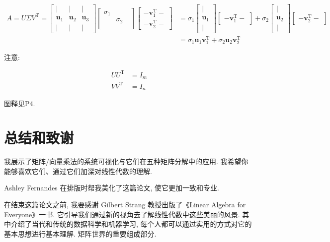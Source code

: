 \documentclass[letterpaper]{article}
\DeclareRobustCommand\transp{^{\mathrm{T}}}
\begin{document}
\begin{align*}
  A = U \Sigma V\transp =
  \begin{bmatrix}
    | & | & |\\
    \bm{u}_1 & \bm{u}_2 & \bm{u}_3\\
    | & | & |
  \end{bmatrix}
  \begin{bmatrix}
    \sigma_1 \\
           & \sigma_2 \\
           & &
  \end{bmatrix}
  \begin{bmatrix}
  - \bm{v}_1\transp -\\
  - \bm{v}_2\transp -
  \end{bmatrix}
  & =
  \sigma_1 \begin{bmatrix}
    |\\
    \bm{u}_1\\
    |
  \end{bmatrix}
  \begin{bmatrix}
    - \bm{v}_1\transp - 
  \end{bmatrix}
  +
  \sigma_2 \begin{bmatrix}
  |\\
  \bm{u}_2\\
  |
  \end{bmatrix}
  \begin{bmatrix}
  - \bm{v}_2\transp -
  \end{bmatrix} \\
& = \sigma_1 \bm{u}_1 \bm{v}_1\transp + \sigma_2 \bm{u}_2 \bm{v}_2\transp
\end{align*}

注意: 

\begin{align*}
  U U\transp &= I_m \\
  V V\transp &= I_n
\end{align*}

图释见P4.

\section*{总结和致谢}

我展示了矩阵/向量乘法的系统可视化与它们在五种矩阵分解中的应用. 
我希望你能够喜欢它们、通过它们加深对线性代数的理解. 

Ashley Fernandes 在排版时帮我美化了这篇论文, 使它更加一致和专业. 

在结束这篇论文之前, 我要感谢 Gilbert Strang 教授出版了《Linear Algebra for Everyone》一书. 
它引导我们通过新的视角去了解线性代数中这些美丽的风景. 
其中介绍了当代和传统的数据科学和机器学习, 每个人都可以通过实用的方式对它的基本思想进行基本理解. 矩阵世界的重要组成部分. 
\end{document}
